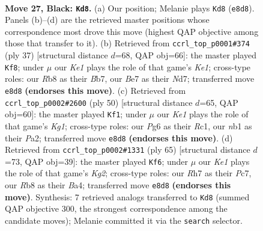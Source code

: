 \documentclass[11pt]{article}
\begin{document}
\clearpage

\begin{figure}[p]\centering
\begin{subfigure}{0.46\textwidth}\centering
\resizebox{\linewidth}{!}{%
\newchessgame
\chessboard[
  setfen={1rb1k3/p1p1bp1r/P1p3p1/2P4p/1P3P1P/8/3B3R/RN2K3 b Q - 2 27},
  showmover=false,
  pgfstyle=straightmove, color=movearrow, markmove={e8-d8}
]}
\caption{}
\end{subfigure}\hfill
\begin{subfigure}{0.46\textwidth}\centering
\resizebox{\linewidth}{!}{%
\newchessgame
\chessboard[
  setfen={r3k3/pb1n1pr1/4p2p/1NP5/1pp1P2P/5B2/PP3PP1/R3K2R b KQq - 1 19},
  showmover=false,
  pgfstyle=straightmove, color=movearrow, markmove={e8-f8}
]}
\caption{}
\end{subfigure}
\\[4pt]
\begin{subfigure}{0.46\textwidth}\centering
\resizebox{\linewidth}{!}{%
\newchessgame
\chessboard[
  setfen={1rr5/p3k3/4ppp1/1bb4p/2p4P/2B1P1P1/PP1RBP2/2R3K1 w - - 9 26},
  showmover=false,
  pgfstyle=straightmove, color=movearrow, markmove={g1-f1}
]}
\caption{}
\end{subfigure}\hfill
\begin{subfigure}{0.46\textwidth}\centering
\resizebox{\linewidth}{!}{%
\newchessgame
\chessboard[
  setfen={1r6/2prbpk1/8/1P2p2p/b3P1p1/P3B1P1/1R2BP2/1R4K1 b - - 13 33},
  showmover=false,
  pgfstyle=straightmove, color=movearrow, markmove={g7-f6}
]}
\caption{}
\end{subfigure}
\caption{\textbf{Move 27, Black: \texttt{Kd8}.} (a) Our position; Melanie plays \texttt{Kd8} (\texttt{e8d8}). Panels (b)--(d) are the retrieved master positions whose correspondence most drove this move (highest QAP objective among those that transfer to it). (b) Retrieved from \texttt{ccrl\_top\_p0001\#374} (ply 37) [structural distance $d$=68, QAP obj=66]: the master played \texttt{Kf8}; under $\mu$ our \emph{Ke1} plays the role of that game's \emph{Ke1}; cross-type roles: our \emph{R}b8 as their \emph{B}b7, our \emph{B}e7 as their \emph{N}d7; transferred move \texttt{e8d8} \textbf{(endorses this move)}. (c) Retrieved from \texttt{ccrl\_top\_p0002\#2600} (ply 50) [structural distance $d$=65, QAP obj=60]: the master played \texttt{Kf1}; under $\mu$ our \emph{Ke1} plays the role of that game's \emph{Kg1}; cross-type roles: our \emph{P}g6 as their \emph{R}c1, our \emph{n}b1 as their \emph{P}a2; transferred move \texttt{e8d8} \textbf{(endorses this move)}. (d) Retrieved from \texttt{ccrl\_top\_p0002\#1331} (ply 65) [structural distance $d$=73, QAP obj=39]: the master played \texttt{Kf6}; under $\mu$ our \emph{Ke1} plays the role of that game's \emph{Kg2}; cross-type roles: our \emph{R}h7 as their \emph{P}c7, our \emph{R}b8 as their \emph{B}a4; transferred move \texttt{e8d8} \textbf{(endorses this move)}. Synthesis: 7 retrieved analogs transferred to \texttt{Kd8} (summed QAP objective 300, the strongest correspondence among the candidate moves); Melanie committed it via the \texttt{search} selector.}
\label{fig:thought-m53}
\end{figure}
\end{document}
